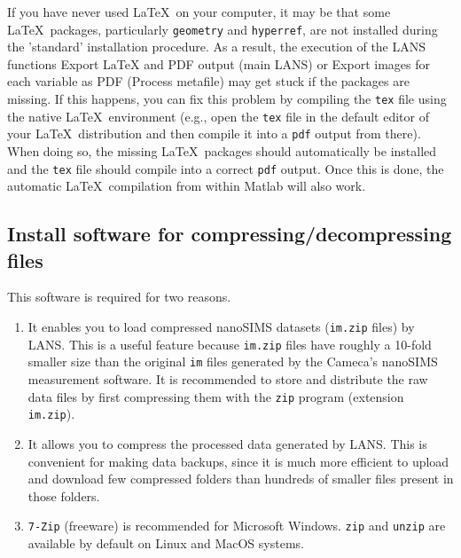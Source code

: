 \documentclass[a4paper, 11pt]{article}
\newcommand{\ttt}[1]{\texttt{#1}}
\newcommand{\lans}[1]{{\color{magenta}#1}}
\newcommand\mnote{\marginnote{\fbox{\textbf{\bf Note}}}}
\begin{document}
\mnote
If you have never used \LaTeX\ on your computer, it may be that some \LaTeX\ packages, particularly \ttt{geometry} and \ttt{hyperref}, are not installed during the 'standard' installation procedure. As a result, the execution of the LANS functions \lans{Export LaTeX and PDF output} (main LANS) or \lans{Export images for each variable as PDF} (Process metafile) may get stuck if the packages are missing. If this happens, you can fix this problem by compiling the \ttt{tex} file using the native \LaTeX\ environment (e.g., open the \ttt{tex} file in the default editor of your \LaTeX\ distribution and then compile it into a \ttt{pdf} output from there). When doing so, the missing \LaTeX\ packages should automatically be installed and the \ttt{tex} file should compile into a correct \ttt{pdf} output. Once this is done, the automatic \LaTeX\ compilation from within Matlab will also work.


\subsection{Install software for compressing/decompressing files}

This software is required for two reasons.

\begin{enumerate}
 
\item It enables you to load compressed nanoSIMS datasets (\ttt{im.zip} files) by LANS. This is a useful feature because \ttt{im.zip} files have roughly a 10-fold smaller size than the original \ttt{im} files generated by the Cameca's nanoSIMS measurement software. It is recommended to store and distribute the raw data files by first compressing them with the \ttt{zip} program (extension \ttt{im.zip}). 

\item It allows you to compress the processed data generated by LANS. This is convenient for making data backups, since it is much more efficient to upload and download few compressed folders than hundreds of smaller files present in those folders.

\item \ttt{7-Zip} (freeware) is recommended for Microsoft Windows. \ttt{zip} and \ttt{unzip} are available by default on Linux and MacOS systems.

\end{enumerate}

\end{document}
